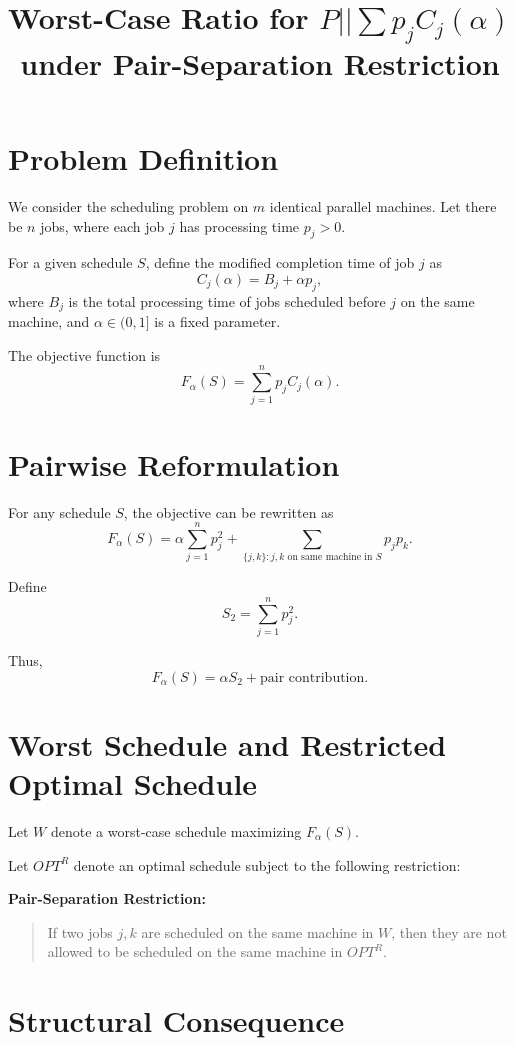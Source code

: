 \documentclass[11pt]{article}
\title{Worst-Case Ratio for $P||\sum p_j C_j(\alpha)$ under Pair-Separation Restriction}
\author{}
\date{}
\begin{document}
\maketitle

\section{Problem Definition}

We consider the scheduling problem on $m$ identical parallel machines. Let there be $n$ jobs, where each job $j$ has processing time $p_j > 0$.

For a given schedule $S$, define the modified completion time of job $j$ as
\[
C_j(\alpha) = B_j + \alpha p_j,
\]
where $B_j$ is the total processing time of jobs scheduled before $j$ on the same machine, and $\alpha \in (0,1]$ is a fixed parameter.

The objective function is
\[
F_\alpha(S) = \sum_{j=1}^n p_j C_j(\alpha).
\]

\section{Pairwise Reformulation}

For any schedule $S$, the objective can be rewritten as
\[
F_\alpha(S)
=
\alpha \sum_{j=1}^n p_j^2
+
\sum_{\{j,k\}: j,k \text{ on same machine in } S} p_j p_k.
\]

Define
\[
S_2 = \sum_{j=1}^n p_j^2.
\]

Thus,
\[
F_\alpha(S) = \alpha S_2 + \text{pair contribution}.
\]

\section{Worst Schedule and Restricted Optimal Schedule}

Let $W$ denote a worst-case schedule maximizing $F_\alpha(S)$.

Let $OPT^R$ denote an optimal schedule subject to the following restriction:

\medskip

\noindent
\textbf{Pair-Separation Restriction:}
\begin{quote}
If two jobs $j,k$ are scheduled on the same machine in $W$, then they are not allowed to be scheduled on the same machine in $OPT^R$.
\end{quote}

\medskip

\section{Structural Consequence}
\end{document}
